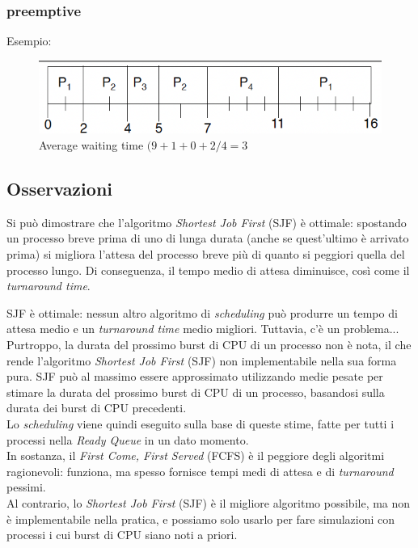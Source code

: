 \subsubsection{preemptive}
Esempio:
\begin{figure}[ht]
    \centering
    \includegraphics[width=0.2\linewidth]{images/SJF_preemptive.png}
    \caption{Average waiting time $(9 + 1 + 0 + 2/4 = 3$}
\end{figure}


\subsection{Osservazioni}
Si può dimostrare che l'algoritmo \textit{Shortest Job First} (SJF) è ottimale: spostando un processo breve prima di uno di lunga durata (anche se quest’ultimo è arrivato prima) si migliora l'attesa del processo breve più di quanto si peggiori quella del processo lungo. Di conseguenza, il tempo medio di attesa diminuisce, così come il \textit{turnaround time}.

SJF è ottimale: nessun altro algoritmo di \textit{scheduling} può produrre un tempo di attesa medio e un \textit{turnaround time} medio migliori. Tuttavia, c'è un problema...\\
Purtroppo, la durata del prossimo burst di CPU di un processo non è nota, il che rende l'algoritmo \textit{Shortest Job First} (SJF) non implementabile nella sua forma pura. SJF può al massimo essere approssimato utilizzando medie pesate per stimare la durata del prossimo burst di CPU di un processo, basandosi sulla durata dei burst di CPU precedenti.\\

Lo \textit{scheduling} viene quindi eseguito sulla base di queste stime, fatte per tutti i processi nella \textit{Ready Queue} in un dato momento.\\
In sostanza, il \textit{First Come, First Served} (FCFS) è il peggiore degli algoritmi ragionevoli: funziona, ma spesso fornisce tempi medi di attesa e di \textit{turnaround} pessimi.\\

Al contrario, lo \textit{Shortest Job First} (SJF) è il migliore algoritmo possibile, ma non è implementabile nella pratica, e possiamo solo usarlo per fare simulazioni con processi i cui burst di CPU siano noti a priori.\\

